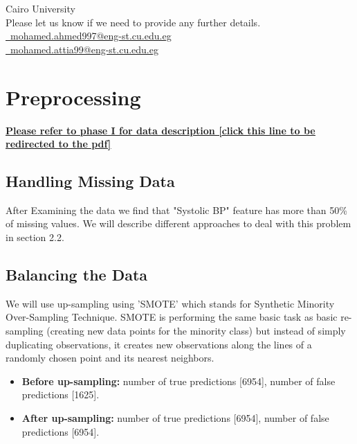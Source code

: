 \documentclass[5 pt]{article}
\begin{document}
\begin{titlepage}
\begin{center}
\vspace{1cm}
 Cairo University\\
Please let us know if we need to provide any further details.\\
\underline{\faEnvelope\ \href{mailto:mohamed.ahmed997@eng-st.cu.edu.eg}{mohamed.ahmed997@eng-st.cu.edu.eg}}\\
\underline{\faEnvelope\ \href{mailto:mohamed.attia99@eng-st.cu.edu.eg}{mohamed.attia99@eng-st.cu.edu.eg}}


\end{center}
\end{titlepage}


\tableofcontents
\vspace{8cm}
\listoffigures
\newpage


\section{Preprocessing}

\textbf{\underline{\href{https://github.com/mohamed-abdelaziz721/ml-final-project/blob/main/PhaseI.pdf}{Please refer to phase I for data description [click this line to be redirected to the pdf]}}}

\subsection{Handling Missing Data}
After Examining the data we find that "Systolic BP" feature has more than 50\% of missing values. We will describe different approaches to deal with this problem in section 2.2.
\subsection{Balancing the Data}
We will use up-sampling using 'SMOTE' which stands for Synthetic Minority Over-Sampling Technique. SMOTE is performing the same basic task as basic re-sampling (creating new data points for the minority class) but instead of simply duplicating observations, it creates new observations along the lines of a randomly chosen point and its nearest neighbors.
\begin{itemize}
    \item \textbf{Before up-sampling:} number of true predictions [6954], number of false predictions [1625].  
    \item \textbf{After up-sampling:} number of true predictions [6954], number of false predictions [6954].
\end{itemize}
\end{document}
